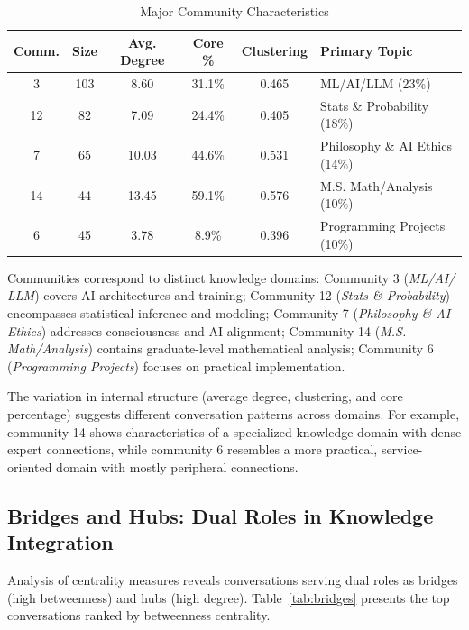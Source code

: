 \documentclass{svproc}
\begin{document}
\begin{table}
\centering
\caption{Major Community Characteristics}
\label{tab:communities}
\begin{tabular}{cccccl}
\toprule
\textbf{Comm.} & \textbf{Size} & \textbf{Avg. Degree} & \textbf{Core \%} & \textbf{Clustering} & \textbf{Primary Topic} \\
\midrule
3 & 103 & 8.60 & 31.1\% & 0.465 & ML/AI/LLM (23\%) \\
12 & 82 & 7.09 & 24.4\% & 0.405 & Stats \& Probability (18\%) \\
7 & 65 & 10.03 & 44.6\% & 0.531 & Philosophy \& AI Ethics (14\%) \\
14 & 44 & 13.45 & 59.1\% & 0.576 & M.S. Math/Analysis (10\%) \\
6 & 45 & 3.78 & 8.9\% & 0.396 & Programming Projects (10\%) \\
\bottomrule
\end{tabular}
\end{table}

Communities correspond to distinct knowledge domains: Community 3 (\emph{ML/AI/\\LLM}) covers AI architectures and training; Community 12 (\emph{Stats \& Probability}) encompasses statistical inference and modeling; Community 7 (\emph{Philosophy \& AI Ethics}) addresses consciousness and AI alignment; Community 14 (\emph{M.S. Math/Analysis}) contains graduate-level mathematical analysis; Community 6 (\emph{Programming Projects}) focuses on practical implementation.

The variation in internal structure (average degree, clustering, and core percentage) suggests different conversation patterns across domains. For example, community 14 shows characteristics of a specialized knowledge domain with dense expert connections, while community 6 resembles a more practical, service-oriented domain with mostly peripheral connections.

\subsection{Bridges and Hubs: Dual Roles in Knowledge Integration}

Analysis of centrality measures reveals conversations serving dual roles as bridges (high betweenness) and hubs (high degree). Table~\ref{tab:bridges} presents the top conversations ranked by betweenness centrality.
\end{document}

